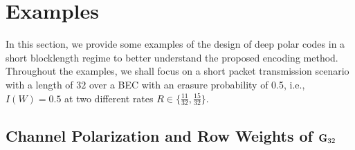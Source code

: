 \documentclass[conference]{IEEEtran}
\begin{document}
%
%
%  





 

\section{Examples }
In this section, we provide some examples of the design of deep polar codes in a short blocklength regime to better understand the proposed encoding method.  Throughout the examples, we shall focus on a short packet transmission scenario with a length of $32$ over a BEC with an erasure probability of 0.5, i.e., $I(W)=0.5$ at two different rates $R\in \{\frac{11}{32},\frac{15}{32}\}$. 


\subsection{Channel Polarization and Row Weights of ${\bf G}_{32}$}
\end{document}
